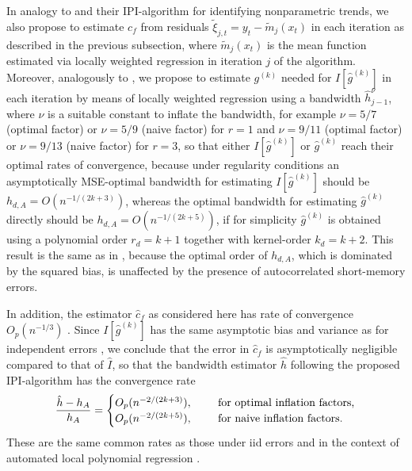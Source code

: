 \noindent
In analogy to \citet{feng2020datadriven} and their IPI-algorithm for identifying nonparametric trends, we also propose to estimate \(c_f\) from residuals \(\tilde{\xi}_{j,t}=y_t-\tilde{m}_j(x_t)\) in each iteration as described in the previous subsection, where \(\tilde{m}_j(x_t)\) is the mean function estimated via locally weighted regression in iteration \(j\) of the algorithm. Moreover, analogously to \citet{feng2020datadriven}, we propose to estimate \(g^{(k)}\) needed for \(I\left[\hat g^{(k)} \right]\) in each iteration by means of locally weighted regression using a bandwidth \(\hat h_{j-1}^{\nu}\), where \(\nu\) is a suitable constant to inflate the bandwidth, for example \(\nu = 5/7\) (optimal factor) or \(\nu = 5 / 9\) (naive factor) for \(r = 1\) and \(\nu = 9/11\) (optimal factor) or \(\nu = 9/13\) (naive factor) for \(r = 3\), so that either \(I\left[\hat g^{(k)} \right]\) or \(\hat g^{(k)}\) reach their optimal rates of convergence, because under regularity conditions an asymptotically MSE-optimal bandwidth for estimating \(I\left[\hat g^{(k)} \right]\) should be \(h_{d,A}=O(n^{-1/(2k+3)})\), whereas the optimal bandwidth for estimating \(\hat g^{(k)}\) directly should be \(h_{d,A}=O(n^{-1/(2k+5)})\), if for simplicity \(\hat g^{(k)}\) is obtained using a polynomial order \(r_d = k+1\) together with kernel-order \(k_d=k+2\). This result is the same as in \citet{feng2013seasonal}, because the optimal order of \(h_{d,A}\), which is dominated by the squared bias, is unaffected by the presence of autocorrelated short-memory errors.

In addition, the estimator \(\hat c_f\) as considered here has rate of convergence \(O_p(n^{-1/3})\) \citep{buhlmann1996locally, feng2020datadriven}. Since \(I\left[\hat g^{(k)}\right]\) has the same asymptotic bias and variance as for independent errors \citep[see Equations (18) and (19) in][]{feng2013seasonal}, we conclude that the error in \(\hat c_f\) is asymptotically negligible compared to that of \(\hat I\), so that the bandwidth estimator \(\hat h\) following the proposed IPI-algorithm has the convergence rate
\begin{equation}
\frac{\hat h - h_A}{h_A}=\begin{cases}
O_p(n^{-2/(2k+3)}),& \hspace{4mm} \text{ for optimal inflation factors,}\\
O_p(n^{-2/(2k+5)}),& \hspace{4mm} \text{ for naive inflation factors.}
\end{cases}
\label{eq:hconvergence}
\end{equation}
These are the same common rates as those under iid errors \citep{feng2013seasonal} and in the context of automated local polynomial regression \citep{franciscofernandez2004plugin, feng2020datadriven}.

